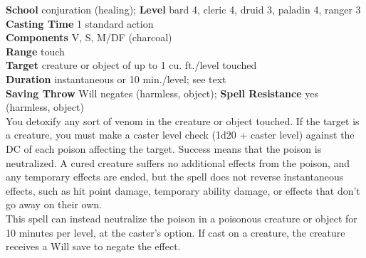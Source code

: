 \textbf{School }conjuration (healing); \textbf{Level }bard 4, cleric 4, druid 3, paladin 4, ranger 3\\
\textbf{Casting Time }1 standard action\\
\textbf{Components }V, S, M/DF (charcoal)\\
\textbf{Range }touch\\
\textbf{Target }creature or object of up to 1 cu. ft./level touched\\
\textbf{Duration }instantaneous or 10 min./level; see text\\
\textbf{Saving Throw }Will negates (harmless, object); \textbf{Spell Resistance }yes (harmless, object)\\
You detoxify any sort of venom in the creature or object touched. If the target is a creature, you must make a caster level check (1d20 + caster level) against the DC of each poison affecting the target. Success means that the poison is neutralized. A cured creature suffers no additional effects from the poison, and any temporary effects are ended, but the spell does not reverse instantaneous effects, such as hit point damage, temporary ability damage, or effects that don't go away on their own.\\
This spell can instead neutralize the poison in a poisonous creature or object for 10 minutes per level, at the caster's option. If cast on a creature, the creature receives a Will save to negate the effect.\\
